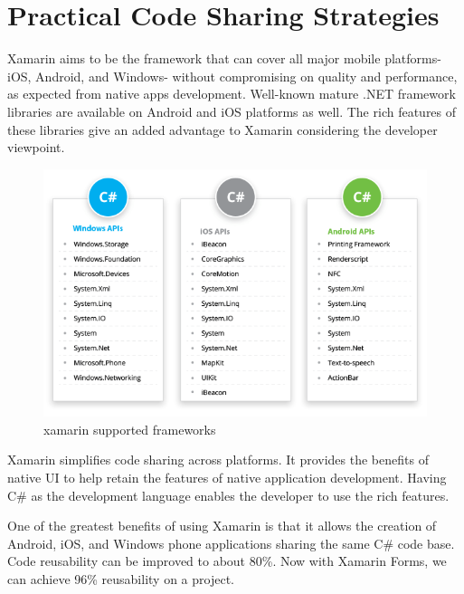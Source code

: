 \section{Practical Code Sharing Strategies}

Xamarin aims to be the framework that can cover all major mobile platforms- iOS, Android, and Windows- without compromising on quality and performance, as expected from native apps development.
Well-known mature .NET framework libraries are available on Android and iOS platforms as well. The rich features of these libraries give an added advantage to Xamarin considering the developer viewpoint.

\begin{figure}[th]
\centering
\includegraphics[width=\textwidth] {Figures/xamarin-supported-frameworks}

\caption[xamarinsupportedframeworks]{xamarin supported frameworks}
\label{fig:xamarin supported frameworks}
\end{figure}


Xamarin simplifies code sharing across platforms. It provides the benefits of native UI to help retain the features of native application development. Having C\# as the development language enables the developer to use the rich features.


One of the greatest benefits of using Xamarin is that it allows the creation of Android, iOS, and Windows phone applications sharing the same C\# code base.
Code reusability can be improved to about 80\%. Now with Xamarin Forms, we can achieve 96\% reusability on a project.



